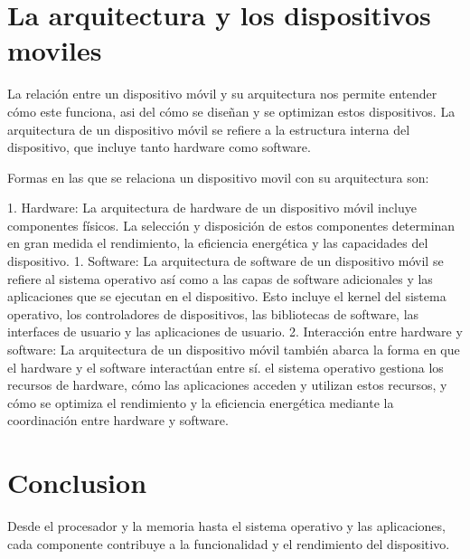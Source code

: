 \documentclass{article}
\begin{document}
		\section{La arquitectura y los dispositivos moviles}
		
		La relación entre un dispositivo móvil y su arquitectura nos permite entender cómo este funciona, asi del cómo se diseñan y se optimizan estos dispositivos. La arquitectura de un dispositivo móvil se refiere a la estructura interna del dispositivo, que incluye tanto hardware como software.
		
		Formas en las que se relaciona un dispositivo movil con su arquitectura son:
		
		1. Hardware: La arquitectura de hardware de un dispositivo móvil incluye componentes físicos. La selección y disposición de estos componentes determinan en gran medida el rendimiento, la eficiencia energética y las capacidades del dispositivo.
		1. Software: La arquitectura de software de un dispositivo móvil se refiere al sistema operativo  así como a las capas de software adicionales y las aplicaciones que se ejecutan en el dispositivo. Esto incluye el kernel del sistema operativo, los controladores de dispositivos, las bibliotecas de software, las interfaces de usuario y las aplicaciones de usuario. 
		2. Interacción entre hardware y software: La arquitectura de un dispositivo móvil también abarca la forma en que el hardware y el software interactúan entre sí. el sistema operativo gestiona los recursos de hardware, cómo las aplicaciones acceden y utilizan estos recursos, y cómo se optimiza el rendimiento y la eficiencia energética mediante la coordinación entre hardware y software.
		
		\section{Conclusion}
		Desde el procesador y la memoria hasta el sistema operativo y las aplicaciones, cada componente contribuye a la funcionalidad y el rendimiento del dispositivo. 
	
\end{document}
